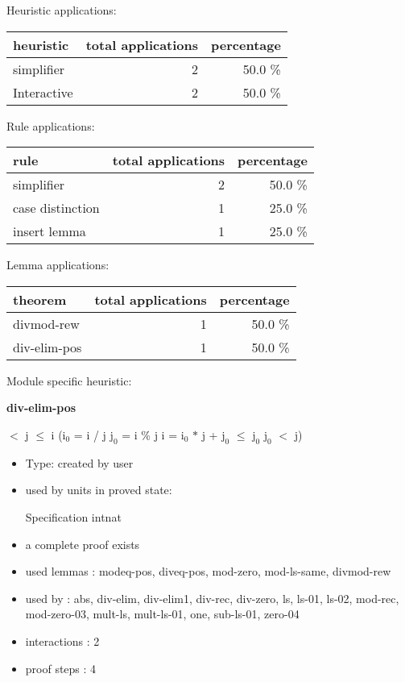 \documentclass[a4paper]{article}
\begin{document}
\medskip


Heuristic applications:

\begin{supertabular}{l|r|r}
heuristic	& total applications & percentage \\ \hline
simplifier & 2 & 50.0 \% \\
Interactive & 2 & 50.0 \% \\

\end{supertabular}

Rule applications:

\begin{supertabular}{l|r|r}
rule	        & total applications & percentage \\ \hline
simplifier & 2 & 50.0 \% \\
case distinction & 1 & 25.0 \% \\
insert lemma & 1 & 25.0 \% \\

\end{supertabular}

Lemma applications:

\begin{supertabular}{l|r|r}
theorem	        & total applications & percentage \\ \hline
divmod-rew & 1 & 50.0 \% \\
div-elim-pos & 1 & 50.0 \% \\

\end{supertabular}

Module specific heuristic:

\pagebreak

{\LARGE\bf div-elim-pos}\label{lemma-div-elim-pos}

\medskip

  $<$ j  $\le$ i \Imp ($\mbox{i}_{0}$ = i / j \And $\mbox{j}_{0}$ = i \% j \Equiv i = $\mbox{i}_{0}$ $*$ j + $\mbox{j}_{0}$  $\le$ $\mbox{j}_{0}$ \And $\mbox{j}_{0}$ $<$ j)

\begin{itemize}

\item Type: created by user

\item used by units in proved state:

Specification intnat
\item       a complete proof exists
\item       used lemmas  : modeq-pos, diveq-pos, mod-zero, mod-ls-same, divmod-rew
\item       used by      : abs, div-elim, div-elim1, div-rec, div-zero, ls, ls-01, ls-02, mod-rec, mod-zero-03, mult-ls, mult-ls-01, one, sub-ls-01, zero-04
\item       interactions : 2
\item       proof steps  : 4
\end{itemize}
\end{document}

